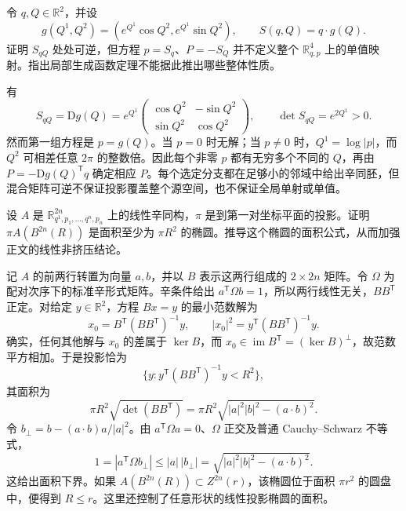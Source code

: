 \begin{exercise}\label{g4:ex:0804:local-not-global}
	令 \(q,Q\in\mathbb R^2\)，并设
	\[
		g(Q^1,Q^2)=(e^{Q^1}\cos Q^2,e^{Q^1}\sin Q^2),
		\qquad S(q,Q)=q\cdot g(Q).
	\]
	证明 \(S_{qQ}\) 处处可逆，但方程 \(p=S_q\)、\(P=-S_Q\) 并不定义整个 \(\mathbb R^4_{q,p}\) 上的单值映射。指出局部生成函数定理不能据此推出哪些整体性质。
\end{exercise}
\begin{solution}
	有
	\[
		S_{qQ}=\mathrm{D}g(Q)
		=e^{Q^1}\begin{pmatrix}\cos Q^2&-\sin Q^2\\\sin Q^2&\cos Q^2\end{pmatrix},
		\qquad \det S_{qQ}=e^{2Q^1}>0.
	\]
	然而第一组方程是 \(p=g(Q)\)。当 \(p=0\) 时无解；当 \(p\ne0\) 时，\(Q^1=\log|p|\)，而 \(Q^2\) 可相差任意 \(2\pi\) 的整数倍。因此每个非零 \(p\) 都有无穷多个不同的 \(Q\)，再由 \(P=-\mathrm{D}g(Q)^{\mathsf T}q\) 确定相应 \(P\)。每个选定分支都在足够小的邻域中给出辛同胚，但混合矩阵可逆不保证投影覆盖整个源空间，也不保证全局单射或单值。
\end{solution}

\begin{exercise}\label{g4:ex:0805:projection-area}
	设 \(A\) 是 \(\mathbb R^{2n}_{q^1,p_1,\ldots,q^n,p_n}\) 上的线性辛同构，\(\pi\) 是到第一对坐标平面的投影。证明 \(\pi A(B^{2n}(R))\) 是面积至少为 \(\pi R^2\) 的椭圆。推导这个椭圆的面积公式，从而加强正文的线性非挤压结论。
\end{exercise}
\begin{solution}
	记 \(A\) 的前两行转置为向量 \(a,b\)，并以 \(B\) 表示这两行组成的 \(2\times2n\) 矩阵。令 \(\Omega\) 为配对次序下的标准辛形式矩阵。辛条件给出 \(a^{\mathsf T}\Omega b=1\)，所以两行线性无关，\(BB^{\mathsf T}\) 正定。对给定 \(y\in\mathbb R^2\)，方程 \(Bx=y\) 的最小范数解为
	\[
		x_0=B^{\mathsf T}(BB^{\mathsf T})^{-1}y,
		\qquad |x_0|^2=y^{\mathsf T}(BB^{\mathsf T})^{-1}y.
	\]
	确实，任何其他解与 \(x_0\) 的差属于 \(\ker B\)，而 \(x_0\in\operatorname{im}B^{\mathsf T}=(\ker B)^\perp\)，故范数平方相加。于是投影恰为
	\[
		\{y:y^{\mathsf T}(BB^{\mathsf T})^{-1}y<R^2\},
	\]
	其面积为
	\[
		\pi R^2\sqrt{\det(BB^{\mathsf T})}
		=\pi R^2\sqrt{|a|^2|b|^2-(a\cdot b)^2}.
	\]
	令 \(b_\perp=b-(a\cdot b)a/|a|^2\)。由 \(a^{\mathsf T}\Omega a=0\)、\(\Omega\) 正交及普通 Cauchy--Schwarz 不等式，
	\[
		1=|a^{\mathsf T}\Omega b_\perp|
		\le |a|\,|b_\perp|
		=\sqrt{|a|^2|b|^2-(a\cdot b)^2}.
	\]
	这给出面积下界。如果 \(A(B^{2n}(R))\subset Z^{2n}(r)\)，该椭圆位于面积 \(\pi r^2\) 的圆盘中，便得到 \(R\le r\)。这里还控制了任意形状的线性投影椭圆的面积。
\end{solution}
